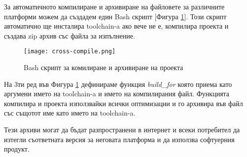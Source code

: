 За автоматичното компилиране и архивиране на файловете за различните платформи
можем да създадем един Bash скрипт [Фигура \ref{fig:cross-compile}]. Този
скрипт автоматично ще инсталира toolchain-a ако вече не е, компилира проекта и
създава zip архив със файла за изпълнение.

\begin{figure}[!htb]
  \texttt{[image: cross-compile.png]}
  \centering
  \caption{Bash скрипт за комилиране и архивиране на проекта}
  \label{fig:cross-compile}
\end{figure}

На 3ти ред във Фигура \ref{fig:cross-compile} дефинираме функция
\textit{build\_for} която приема като аргумени името на toolchain-a и името на
компилирания файл. Функцията компилира и проекта използвайки всички оптимизации
и го архивира във файл със същотот име като името на toolchain-a.

Тези архиви могат да бъдат разпространени в интернет и всеки потребител да
изтегли съответната версия за неговата платформа и да използва софтуерния
продукт.


